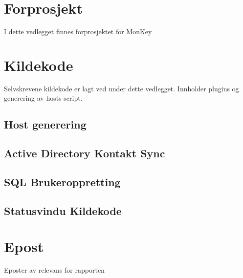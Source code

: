 \documentclass[a4paper,twoside,11pt,pdftex,norsk]{report}
\newcounter{includepdfpage}
\newcounter{currentpagecounter}
\newcommand{\addlabelstoallincludedpages}[1]{
   \refstepcounter{includepdfpage}
   \stepcounter{currentpagecounter}
	\appendix
   \label{#1.\thecurrentpagecounter}}
\newcommand{\modifiedincludepdf}[3]{
    \setcounter{currentpagecounter}{0}
    }
\newenvironment{changemargin}[2]{%
\begin{list}{}{%
\linespread{0.9}%
\setlength{\topsep}{0pt}%
\setlength{\leftmargin}{#1}%
\setlength{\rightmargin}{#2}%
\setlength{\listparindent}{\parindent}%
\setlength{\itemindent}{\parindent}%
\setlength{\parsep}{\parskip}%
}%
\item[]}{\end{list}}
\begin{document}
\begin{appendices}
\chapter{Forprosjekt}\label{app:forprosjekt}
I dette vedlegget finnes forprosjektet for MonKey


\chapter{Kildekode}\label{app:kildekode}
Selvskrevene kildekode er lagt ved under dette vedlegget. Innholder plugins og generering av hosts script.

\begin{changemargin}{-1cm}{-1cm}
\section{Host generering}

\section{Active Directory Kontakt Sync}

\section{SQL Brukeroppretting}


\section{Statusvindu Kildekode}








\end{changemargin}

\chapter{Epost}\label{epost}
Eposter av relevans for rapporten

\end{appendices}
\end{document}
